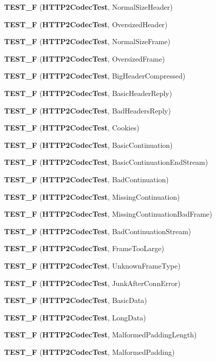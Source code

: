 \begin{DoxyCompactItemize}
{\bf T\+E\+S\+T\+\_\+F} ({\bf H\+T\+T\+P2\+Codec\+Test}, Normal\+Size\+Header)
\item 
{\bf T\+E\+S\+T\+\_\+F} ({\bf H\+T\+T\+P2\+Codec\+Test}, Oversized\+Header)
\item 
{\bf T\+E\+S\+T\+\_\+F} ({\bf H\+T\+T\+P2\+Codec\+Test}, Normal\+Size\+Frame)
\item 
{\bf T\+E\+S\+T\+\_\+F} ({\bf H\+T\+T\+P2\+Codec\+Test}, Oversized\+Frame)
\item 
{\bf T\+E\+S\+T\+\_\+F} ({\bf H\+T\+T\+P2\+Codec\+Test}, Big\+Header\+Compressed)
\item 
{\bf T\+E\+S\+T\+\_\+F} ({\bf H\+T\+T\+P2\+Codec\+Test}, Basic\+Header\+Reply)
\item 
{\bf T\+E\+S\+T\+\_\+F} ({\bf H\+T\+T\+P2\+Codec\+Test}, Bad\+Headers\+Reply)
\item 
{\bf T\+E\+S\+T\+\_\+F} ({\bf H\+T\+T\+P2\+Codec\+Test}, Cookies)
\item 
{\bf T\+E\+S\+T\+\_\+F} ({\bf H\+T\+T\+P2\+Codec\+Test}, Basic\+Continuation)
\item 
{\bf T\+E\+S\+T\+\_\+F} ({\bf H\+T\+T\+P2\+Codec\+Test}, Basic\+Continuation\+End\+Stream)
\item 
{\bf T\+E\+S\+T\+\_\+F} ({\bf H\+T\+T\+P2\+Codec\+Test}, Bad\+Continuation)
\item 
{\bf T\+E\+S\+T\+\_\+F} ({\bf H\+T\+T\+P2\+Codec\+Test}, Missing\+Continuation)
\item 
{\bf T\+E\+S\+T\+\_\+F} ({\bf H\+T\+T\+P2\+Codec\+Test}, Missing\+Continuation\+Bad\+Frame)
\item 
{\bf T\+E\+S\+T\+\_\+F} ({\bf H\+T\+T\+P2\+Codec\+Test}, Bad\+Continuation\+Stream)
\item 
{\bf T\+E\+S\+T\+\_\+F} ({\bf H\+T\+T\+P2\+Codec\+Test}, Frame\+Too\+Large)
\item 
{\bf T\+E\+S\+T\+\_\+F} ({\bf H\+T\+T\+P2\+Codec\+Test}, Unknown\+Frame\+Type)
\item 
{\bf T\+E\+S\+T\+\_\+F} ({\bf H\+T\+T\+P2\+Codec\+Test}, Junk\+After\+Conn\+Error)
\item 
{\bf T\+E\+S\+T\+\_\+F} ({\bf H\+T\+T\+P2\+Codec\+Test}, Basic\+Data)
\item 
{\bf T\+E\+S\+T\+\_\+F} ({\bf H\+T\+T\+P2\+Codec\+Test}, Long\+Data)
\item 
{\bf T\+E\+S\+T\+\_\+F} ({\bf H\+T\+T\+P2\+Codec\+Test}, Malformed\+Padding\+Length)
\item 
{\bf T\+E\+S\+T\+\_\+F} ({\bf H\+T\+T\+P2\+Codec\+Test}, Malformed\+Padding)
\item 

\end{DoxyCompactItemize}
